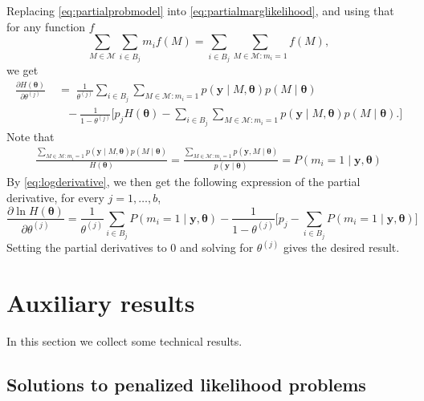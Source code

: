 \documentclass[bj,authoryear]{imsart}
\theoremstyle{plain}
\newcommand{\M}{\mathcal{M}}
\newcommand{\bs}{\boldsymbol}
\begin{document}
    Replacing \eqref{eq:partialprobmodel} into \eqref{eq:partialmarglikelihood}, and using that for any function $f$ $$\sum_{M\in \M}\sum_{i\in B_j}m_if(M)=\sum_{i\in B_j}\sum_{M\in \M:m_i=1}f(M),$$ we get
    \begin{align}\label{eq:partialmarglikelihood2}
        \frac{\partial H(\bs \theta)}{\partial \theta^{(j)}}&\;=\;\frac{1}{\theta^{(j)}}\sum_{i \in B_j}\sum_{M\in \M: m_i=1}p(\bs y \mid M,\bs\theta)p(M \mid \bs \theta) \\&\quad- \frac{1}{1-\theta^{(j)}}\bigg[p_j H(\bs \theta)-\sum_{i \in B_j}\sum_{M\in \M: m_i=1}p(\bs y \mid M,\bs\theta)p(M \mid \bs \theta). \nonumber
        \bigg]
    \end{align}
    Note that
    \begin{align*}
        \frac{\sum_{M\in \M: m_i=1}p(\bs y \mid M,\bs\theta)p(M \mid \bs \theta)}{H(\bs \theta)} = \frac{\sum_{M\in \M: m_i=1}p(\bs y , M\mid \bs \theta)}{p(\bs y \mid \bs \theta)}= P(m_i = 1\mid \bs y,\bs \theta)
    \end{align*}
    By \eqref{eq:logderivative}, we then get the following expression of the partial derivative, for every $j=1,\ldots,b$,
    $$\frac{\partial \ln H(\bs \theta)}{\partial \theta^{(j)}}=\frac{1}{\theta^{(j)}}\sum_{i \in B_j}P(m_i = 1\mid \bs y,\bs \theta) - \frac{1}{1-\theta^{(j)}}\bigg[p_j-\sum_{i \in B_j}P(m_i = 1\mid \bs y,\bs \theta)
        \bigg]$$
    Setting the partial derivatives to 0 and solving for $\theta^{(j)}$ gives the desired result.

\section{Auxiliary results}\label{suppsec:auxiliary}

In this section we collect some technical results.

\subsection{Solutions to penalized likelihood problems}
\end{document}
